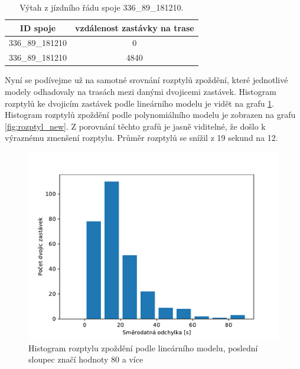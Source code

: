 \begin{center}
   \begin{table}[ht]
\centering
\begin{tabular}{|c|c|}
\hline
ID spoje & vzdálenost zastávky na trase \\ \hline \hline
336\_89\_181210 & 0 \\ \hline
336\_89\_181210 & 4840 \\ \hline
\end{tabular}
\label{tab:9270_ride}
\caption{Výtah z jízdního řádu spoje 336\_89\_181210.}
\end{table}
\end{center}


\bigbreak


Nyní se podívejme už na samotné srovnání rozptylů zpoždění, které jednotlivé modely odhadovaly na trasách mezi danými dvojicemi zastávek. Histogram rozptylů ke dvojicím zastávek podle lineárního modelu je vidět na grafu \ref{fig:rozptyl_old}. Histogram rozptylů zpoždění podle polynomiálního modelu je zobrazen na grafu \ref{fig:rozptyl_new}. Z porovnání těchto grafů je jasně viditelné, že došlo k výraznému zmenšení rozptylu. Průměr rozptylů se snížil z 19 sekund na 12.


\begin{figure}
   \centering
 \includegraphics[width=1\linewidth]{../img/rozptyl_old}
 \caption{Histogram rozptylu zpoždění podle lineárního modelu, poslední sloupec značí hodnoty 80 a více}
 \label{fig:rozptyl_old}
\end{figure}


